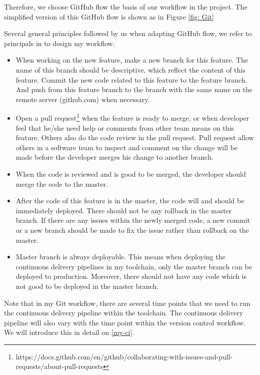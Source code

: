 Therefore, we choose GitHub flow \cite{chacongithub} the basis of our workflow in the project. The simplified version of this GitHub flow is shown as in Figure \ref{fig: Git} 
\par
Several general principles followed by us when adapting GitHub flow, we refer to principals in \cite{chacongithub} to design my workflow.
\begin{itemize}
\item When working on the new feature, make a new branch for this feature. The name of this branch should be descriptive, which reflect the content of this feature. Commit the new code related to this feature to the feature branch. And push from this feature branch to the branch with the same name on the remote server (github.com) when necessary.
\item Open a pull request\footnote{https://docs.github.com/en/github/collaborating-with-issues-and-pull-requests/about-pull-requests} when the feature is ready to merge, or when developer feel that he/she need help or comments from other team means on this feature. Others also do the code review in the pull request. Pull request allow others in a software team to inspect and comment on the change will be made before the developer merges his change to another branch.
\item When the code is reviewed and is good to be merged, the developer should merge the code to the master.
\item After the code of this feature is in the master, the code will and should be immediately deployed. There should not be any rollback in the master branch. If there are any issues within the newly merged code, a new commit or a new branch should be made to fix the issue rather than rollback on the master.
\item Master branch is always deployable. This means when deploying the continuous delivery pipelines in my toolchain, only the master branch can be deployed to production. Moreover, there should not have any code which is not good to be deployed in the master branch.
\end{itemize}
\par
Note that in my Git workflow, there are several time points that we need to run the continuous delivery pipeline within the toolchain. The continuous delivery pipeline will also vary with the time point within the version control workflow. We will introduce this in detail on \ref{my-ci}.
